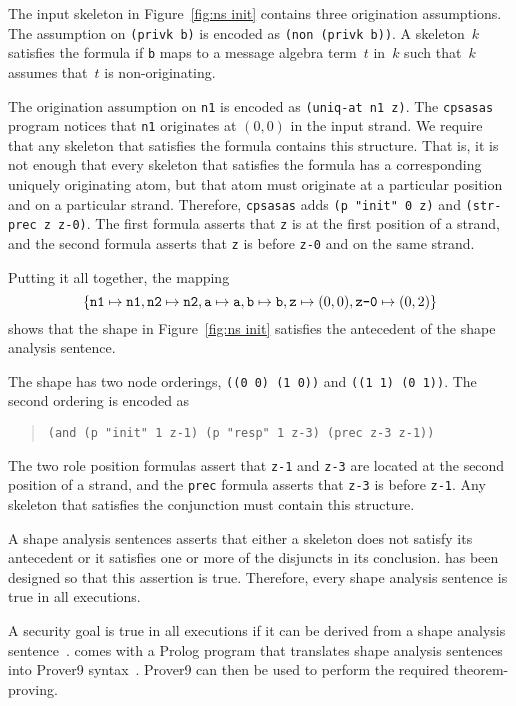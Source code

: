 \documentclass[12pt]{article}
\begin{document}
The input skeleton in Figure~\ref{fig:ns init} contains three
origination assumptions.  The assumption on \texttt{(privk b)} is
encoded as \texttt{(non (privk b))}.  A skeleton~$k$ satisfies the
formula if \texttt{b} maps to a message algebra term~$t$ in~$k$ such
that~$k$ assumes that~$t$ is non-originating.

The origination assumption on \texttt{n1} is encoded as
\texttt{(uniq-at n1 z)}.  The \texttt{cpsasas} program notices that
\texttt{n1} originates at $(0,0)$ in the input strand.  We require
that any skeleton that satisfies the formula contains this structure.
That is, it is not enough that every skeleton that satisfies the
formula has a corresponding uniquely originating atom, but that atom
must originate at a particular position and on a particular strand.
Therefore, \texttt{cpsasas} adds \texttt{(p "init" 0 z)} and
\texttt{(str-prec z z-0)}.  The first formula asserts that \texttt{z}
is at the first position of a strand, and the second formula asserts
that \texttt{z} is before \texttt{z-0} and on the same strand.

Putting it all together, the mapping
\[\{\mathtt{n1}\mapsto\mathtt{n1},
\mathtt{n2}\mapsto\mathtt{n2},
\mathtt{a}\mapsto\mathtt{a},
\mathtt{b}\mapsto\mathtt{b},
\mathtt{z}\mapsto(0,0),
\mbox{\tt z-0}\mapsto(0,2)\}\]
shows that the shape in Figure~\ref{fig:ns init} satisfies the
antecedent of the shape analysis sentence.

The shape has two node orderings, \texttt{((0 0) (1 0))} and
\texttt{((1 1) (0 1))}.  The second ordering is encoded as
\begin{quote}
\begin{verbatim}
(and (p "init" 1 z-1) (p "resp" 1 z-3) (prec z-3 z-1))
\end{verbatim}
\end{quote}
The two role position formulas assert that \texttt{z-1} and
\texttt{z-3} are located at the second position of a strand, and the
\texttt{prec} formula asserts that \texttt{z-3} is before
\texttt{z-1}.  Any skeleton that satisfies the conjunction must
contain this structure.

A shape analysis sentences asserts that either a skeleton does not
satisfy its antecedent or it satisfies one or more of the disjuncts in
its conclusion.  {\cpsa} has been designed so that this assertion is
true.  Therefore, every shape analysis sentence is true in all
executions.

A security goal is true in all executions if it can be derived from a
shape analysis sentence~\cite{Ramsdell12}.  {\cpsa} comes with a
Prolog program that translates shape analysis sentences into Prover9
syntax~\cite{prover9}.  Prover9 can then be used to perform the
required theorem-proving.
\end{document}
